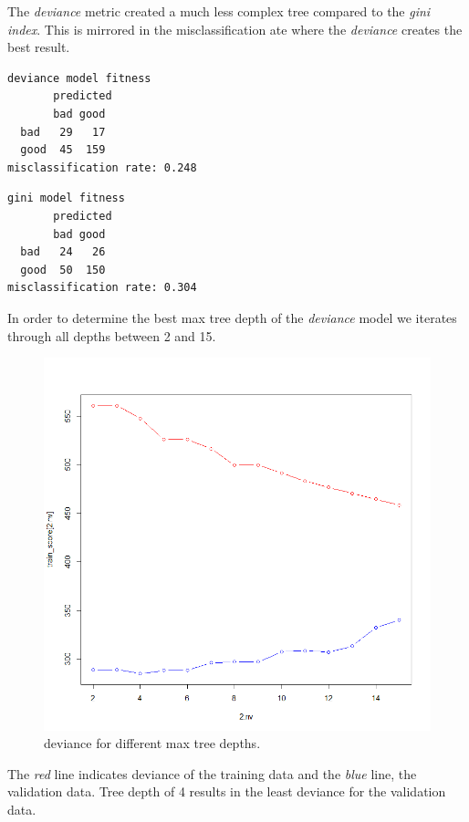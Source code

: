 \documentclass[a4paper,12pt]{article}
\begin{document}
The \textit{deviance} metric created a much less complex tree compared to the \textit{gini index}. This is mirrored in the misclassification ate where the \textit{deviance} creates the best result.

\begin{minipage}[]{0.49\textwidth}
 \begin{verbatim}
deviance model fitness
       predicted
       bad good
  bad   29   17
  good  45  159
misclassification rate: 0.248
\end{verbatim}
 \end{minipage}
 \begin{minipage}[]{0.49\textwidth}
\begin{verbatim}
gini model fitness
       predicted
       bad good
  bad   24   26
  good  50  150
misclassification rate: 0.304
\end{verbatim}
 \end{minipage}

In order to determine the best max tree depth of the \textit{deviance} model we iterates through all depths between 2 and 15.
\begin{figure}[H]
\centering
\begin{minipage}[]{0.5\textwidth}
  \includegraphics[width=\textwidth]{figures/tree_depth.png}  
  \caption{deviance for different max tree depths.\label{fig:logit_plot}}
 \end{minipage}
\end{figure}
The \textit{red} line indicates deviance of the training data and the \textit{blue} line, the validation data. Tree depth of 4 results in the least deviance for the validation data.
\end{document}
